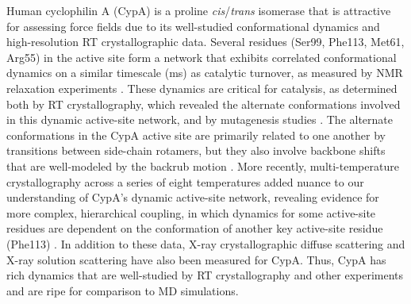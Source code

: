 \documentclass[9pt,review]{livecoms}
\begin{document}
Human cyclophilin A (CypA) is a proline \textit{cis}/\textit{trans} isomerase that is attractive for assessing force fields due to its well-studied conformational dynamics and high-resolution RT crystallographic data.
Several residues (Ser99, Phe113, Met61, Arg55) in the active site form a network that exhibits correlated conformational dynamics on a similar timescale (ms) as catalytic turnover, as measured by NMR relaxation experiments \cite{eisenmesser_intrinsic_2005}.
These dynamics are critical for catalysis, as determined both by RT crystallography, which revealed the alternate conformations involved in this dynamic active-site network, and by mutagenesis studies \cite{fraser_hidden_2009}.
The alternate conformations in the CypA active site are primarily related to one another by transitions between side-chain rotamers, but they also involve backbone shifts that are well-modeled by the backrub motion \cite{davis_backrub_2006,friedland_simple_2008}.
More recently, multi-temperature crystallography across a series of eight temperatures added nuance to our understanding of CypA’s dynamic active-site network, revealing evidence for more complex, hierarchical coupling, in which dynamics for some active-site residues are dependent on the conformation of another key active-site residue (Phe113) \cite{keedy_mapping_2015}.
In addition to these data, X-ray crystallographic diffuse scattering \cite{van_benschoten_measuring_2016} and X-ray solution scattering \cite{thompson_temperature-jump_2019,chen_solvent_2024} have also been measured for CypA.
Thus, CypA has rich dynamics that are well-studied by RT crystallography and other experiments and are ripe for comparison to MD simulations.
\end{document}
